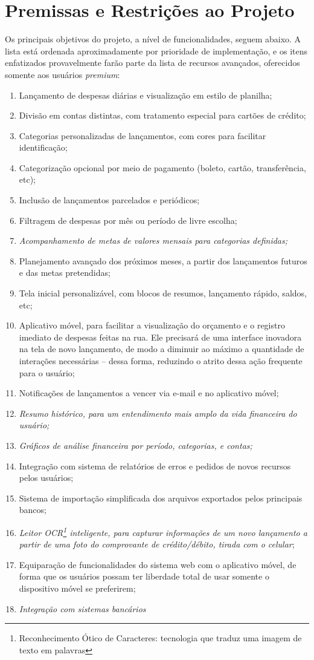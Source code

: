 \documentclass[a4paper]{abnt}
\begin{document}
\section{Premissas e Restrições ao Projeto}
Os principais objetivos do projeto, a nível de funcionalidades, seguem abaixo. A lista está ordenada aproximadamente por prioridade de implementaç\~ao, e os itens enfatizados provavelmente far\~ao parte da lista de recursos avançados, oferecidos somente aos usuários \emph{premium}:
\begin{enumerate}
	\item Lançamento de despesas diárias e visualizaç\~ao em estilo de planilha;
	\item Divis\~ao em contas distintas, com tratamento especial para cart\~oes de crédito;
	\item Categorias personalizadas de lançamentos, com cores para facilitar identificaç\~ao;
	\item Categorizaç\~ao opcional por meio de pagamento (boleto, cart\~ao, transfer\^encia, etc);
	\item Inclus\~ao de lançamentos parcelados e periódicos;
	\item Filtragem de despesas por m\^es ou período de livre escolha;
	\item \emph{Acompanhamento de metas de valores mensais para categorias definidas;}
	\item Planejamento avançado dos próximos meses, a partir dos lançamentos futuros e das metas pretendidas;
	\item Tela inicial personalizável, com blocos de resumos, lançamento rápido, saldos, etc;
	\item Aplicativo móvel, para facilitar a visualizaç\~ao do orçamento e o registro imediato de despesas feitas na rua. Ele precisará de uma interface inovadora na tela de novo lançamento, de modo a diminuir ao máximo a quantidade de interaç\~oes necessárias -- dessa forma, reduzindo o atrito dessa aç\~ao frequente para o usuário;
	\item Notificaç\~oes de lançamentos a vencer via e-mail e no aplicativo móvel;
	\item \emph{Resumo histórico, para um entendimento mais amplo da vida financeira do usuário;}
	\item \emph{Gráficos de análise financeira por período, categorias, e contas;}
	\item Integraç\~ao com sistema de relatórios de erros e pedidos de novos recursos pelos usuários;
	\item Sistema de importaç\~ao simplificada dos arquivos exportados pelos principais bancos;
	\item \emph{Leitor OCR\footnote{Reconhecimento Ótico de Caracteres: tecnologia que traduz uma imagem de texto em palavras} inteligente, para capturar informaç\~oes de um novo lançamento a partir de uma foto do comprovante de crédito/débito, tirada com o celular};
	\item Equiparaç\~ao de funcionalidades do sistema web com o aplicativo móvel, de forma que os usuários possam ter liberdade total de usar somente o dispositivo móvel se preferirem;
	\item \emph{Integraç\~ao com sistemas bancários}
\end{enumerate}
\end{document}
